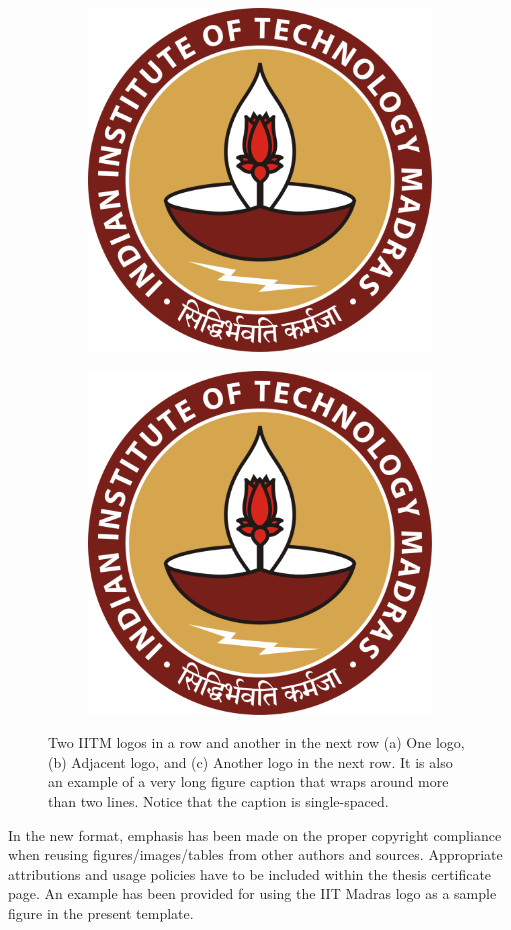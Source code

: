 \begin{figure}[htpb]
\begin{subfigure}{0.5\textwidth}
		\includegraphics[width=0.9\linewidth]{iitmlogo.eps}
		\caption{}
		\label{fig:iitmb}
	\end{subfigure} 	%

	\begin{subfigure}{1\textwidth}
		\centering
		\includegraphics[width=0.45\linewidth]{iitmlogo.eps}
		\caption{}
		\label{fig:iitmc}
\end{subfigure}
    \caption {Two IITM logos in a row and another in the next row (a) One logo, (b) Adjacent logo, and (c) Another logo in the next row. It is also an example of a very long figure caption that wraps around more than two lines. Notice that the caption is single-spaced.}
\label{fig:iitm}
\end{figure}

In the new format, emphasis has been made on the proper copyright compliance when reusing figures/images/tables from other authors and sources. Appropriate attributions and usage policies have to be included within the thesis certificate page. An example has been provided for using the IIT Madras logo as a sample figure in the present template.

